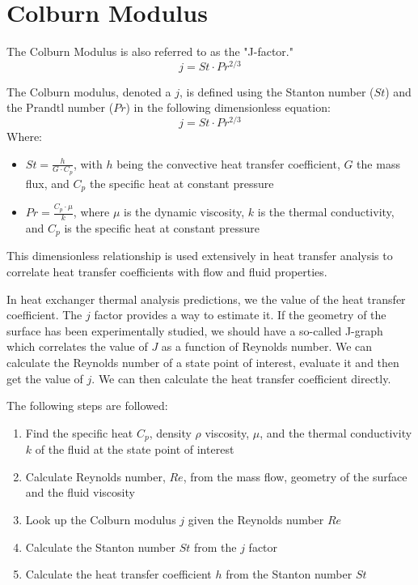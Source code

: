 \documentclass[12pt]{article}
\begin{document}
\section{Colburn Modulus}

The Colburn Modulus is also referred to as the "J-factor."\cite{kaysandlondon}
\begin{equation}
	j=St\cdot{Pr^{2/3}}
\end{equation}

	The Colburn modulus, denoted a $j$, is defined using the Stanton number ($St$) and the Prandtl number ($Pr$) in the following dimensionless equation:
\begin{equation}
	j=St\cdot{Pr^{2/3}}
\end{equation}
Where:
\begin{itemize}
	\item	$St=\frac{h}{G\cdot{C_p}} $, with 		
	$h$ being the convective heat transfer coefficient, 
	$G$ the mass flux, and $C_p$ the specific heat at constant pressure
	\item  	$Pr=\frac{C_p\cdot{\mu}} {k}  $, where 
	$\mu$ is the dynamic viscosity, 
	$k$ is the thermal conductivity, and 
	$C_p$ is the specific heat at constant pressure
\end{itemize}

This dimensionless relationship is used extensively in heat transfer analysis to correlate heat transfer coefficients with flow and fluid properties.

In heat exchanger thermal analysis predictions, we the value of the heat transfer coefficient. The $j$ factor provides a way to estimate it. If the geometry of the surface has been experimentally studied, we should have a so-called J-graph which correlates the value of $J$ as a function of Reynolds number. We can calculate the Reynolds number of a state point of interest, evaluate it and then get the value of $j$. We can then calculate the heat transfer coefficient directly.

The following steps are followed:

\begin{enumerate}
	\item Find the specific heat $C_p$, density $\rho$ viscosity, $\mu$, and the thermal conductivity $k$ of the fluid at the state point of interest
	\item Calculate Reynolds number, $Re$, from the mass flow, geometry of the surface and the fluid viscosity
	\item Look up the Colburn modulus $j$ given the Reynolds number $Re$
	\item Calculate the Stanton number $St$ from the $j$ factor 
	\item Calculate the heat transfer coefficient $h$ from the Stanton number $St$
\end{enumerate}
\end{document}
